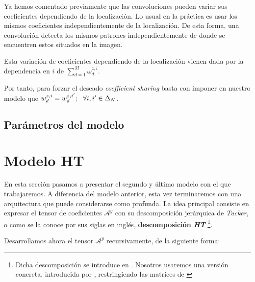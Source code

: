 \begin{observacion}
    Ya hemos comentado previamente que las convoluciones pueden variar sus coeficientes dependiendo de la localización. Lo usual en la práctica es usar los mismos coeficientes independientemente de la localización. De esta forma, una convolución detecta los mismos patrones independientemente de donde se encuentren estos situados en la imagen.

    Esta variación de coeficientes dependiendo de la localización vienen dada por la dependencia en $i$ de $\sum_{d = 1}^M \omega_d^{z ,i}$.

    Por tanto, para forzar el deseado \textit{coefficient sharing} basta con imponer en nuestro modelo que $w_d^{z, i} = w_d^{z, i'}; \ \  \forall i, i' \in \Delta_{N}$.
\end{observacion}


\subsection{Parámetros del modelo} \label{msubsec:parametros_modelo_cp}


\section{Modelo HT}

En esta sección pasamos a presentar el segundo y último modelo con el que trabajaremos. A diferencia del modelo anterior, esta vez terminaremos con una arquitectura que puede considerarse como profunda. La idea principal consiste en expresar el tensor de coeficientes $\mathcal{A}^y$ con su descomposición jerárquica de \textit{Tucker}, o como se la conoce por sus siglas en inglés, \textbf{descomposición \textit{HT}} \footnote{Dicha descomposición se introduce en \cite{matematicas:descomposicion_ht}. Nosotros usaremos una versión concreta, introducida por \cite{matematicas:principal}, restringiendo las matrices de \cite{matematicas:descomposicion_ht}}.

Desarrollamos ahora el tensor $\mathcal{A}^y$ recursivamente, de la siguiente forma:


